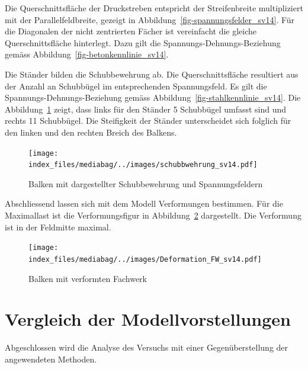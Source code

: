 \documentclass[
  12pt,
  letterpaper,
  egregdoesnotlikesansseriftitles]{scrreprt}
\begin{document}
Die Querschnittsfläche der Druckstreben entspricht der Streifenbreite
multipliziert mit der Parallelfeldbreite, gezeigt in
Abbildung~\ref{fig-spannungsfelder_sv14}. Für die Diagonalen der nicht
zentrierten Fächer ist vereinfacht die gleiche Querschnittsfläche
hinterlegt. Dazu gilt die Spannungs-Dehnungs-Beziehung gemäss
Abbildung~\ref{fig-betonkennlinie_sv14}.

Die Ständer bilden die Schubbewehrung ab. Die Querschnittsfläche
resultiert aus der Anzahl an Schubbügel im entsprechenden Spannungsfeld.
Es gilt die Spannungs-Dehnungs-Beziehung gemäss
Abbildung~\ref{fig-stahlkennlinie_sv14}. Die
Abbildung~\ref{fig-schubbew_fw_sv14} zeigt, dass links für den Ständer 5
Schubbügel umfasst sind und rechts 11 Schubbügel. Die Steifigkeit der
Ständer unterscheidet sich folglich für den linken und den rechten
Breich des Balkens.

\begin{figure}[H]

{\centering \texttt{[image: index\_files/mediabag/../images/schubbwehrung\_sv14.pdf]}

}

\caption{\label{fig-schubbew_fw_sv14}Balken mit dargestellter
Schubbewehrung und Spannungsfeldern}

\end{figure}

Abschliessend lassen sich mit dem Modell Verformungen bestimmen. Für die
Maximallast ist die Verformungsfigur in
Abbildung~\ref{fig-verformung_fachwerk_sv14} dargestellt. Die Verformung
ist in der Feldmitte maximal.

\begin{figure}[H]

{\centering \texttt{[image: index\_files/mediabag/../images/Deformation\_FW\_sv14.pdf]}

}

\caption{\label{fig-verformung_fachwerk_sv14}Balken mit verformten
Fachwerk}

\end{figure}

\hypertarget{vergleich-der-modellvorstellungen-1}{%
\section{Vergleich der
Modellvorstellungen}\label{vergleich-der-modellvorstellungen-1}}

Abgeschlossen wird die Analyse des Versuchs mit einer Gegenüberstellung
der angewendeten Methoden.
\end{document}
